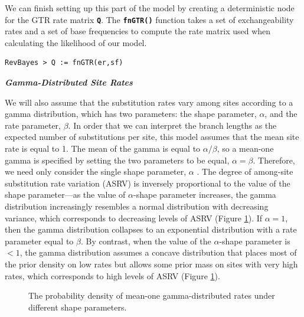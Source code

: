 \documentclass[11pt]{article}
\newcommand{\cl}[1]{{\texttt{\textbf{#1}}}}
\begin{document}
We can finish setting up this part of the model by creating a deterministic node for the GTR rate matrix \cl{Q}. 
The \cl{fnGTR()} function takes a set of exchangeability rates and a set of base frequencies to compute the rate matrix used when calculating the likelihood of our model.
{\tt \begin{snugshade*}
\begin{lstlisting}
RevBayes > Q := fnGTR(er,sf)
\end{lstlisting}
\end{snugshade*}}


\textbf{\textit{Gamma-Distributed Site Rates}}


We will also assume that the substitution rates vary among sites according to a gamma distribution, which has two parameters: the shape parameter, $\alpha$, and the rate parameter, $\beta$. 
In order that we can interpret the branch lengths as the expected number of substitutions per site, this model assumes that the mean site rate is equal to 1.
The mean of the gamma is equal to $\alpha/\beta$, so a mean-one gamma is specified by setting the two parameters to be equal, $\alpha=\beta$.
Therefore, we need only consider the single shape parameter, $\alpha$ \citep{yang94a}. 
The degree of among-site substitution rate variation (ASRV) is inversely proportional to the value of the shape parameter---as the value of $\alpha$-shape parameter increases, the gamma distribution increasingly resembles a normal distribution with decreasing variance, which corresponds to decreasing levels of ASRV (Figure \ref{asrhGammaFig}).
If $\alpha = 1$, then the gamma distribution collapses to an exponential distribution with a rate parameter equal to $\beta$.
By contrast, when the value of the $\alpha$-shape parameter is $< 1$, the gamma distribution assumes a concave distribution that places most of the prior density on low rates but allows some prior mass on sites with very high rates, which corresponds to high levels of ASRV (Figure \ref{asrhGammaFig}).

\begin{figure}[h]
\centering
{}
\caption{\small The probability density of mean-one gamma-distributed rates under different shape parameters.}
\label{asrhGammaFig}
\end{figure}
\end{document}
